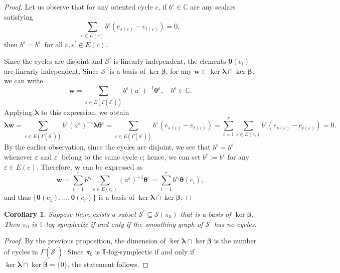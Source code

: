 \documentclass[11pt]{article}
\newcommand{\bbeta}{\boldsymbol{\beta}}
\newcommand{\blambda}{\boldsymbol{\lambda}}
\newcommand{\btheta}{{\boldsymbol{\theta}}}
\newcommand{\bw}{\mathbf{w}}
\newtheorem{corollary}[theorem]{Corollary}
\theoremstyle{definition}\newtheorem{definition}[theorem]{Definition}
\theoremstyle{definition}\newtheorem{remark}[theorem]{Remark}
\theoremstyle{remark}
\numberwithin{equation}{section}
\begin{document}
\begin{proof}
    Let us observe that for any oriented cycle $c$, if $b^{\varepsilon} \in \mathbb{C}$ are any scalars satisfying
    \begin{equation*}
        \sum_{\varepsilon \in E(c)} b^{\varepsilon} (e_{s(\varepsilon)}-e_{t(\varepsilon)}) = 0,
    \end{equation*}
    then $b^{\varepsilon} = b^{\varepsilon^\prime}$ for all $\varepsilon,\varepsilon^\prime \in E(c)$.

    Since the cycles are disjoint and $\mathcal{S}^\prime$ is linearly independent, the elements $\btheta(c_i)$ are linearly independent.
    Since $\mathcal{S}^\prime$ is a basis of $\ker \bbeta$, for any $\bw \in \ker \blambda \cap \ker \bbeta$, we can write
    \begin{equation*}
        \bw = \sum_{\varepsilon \in E(\Gamma(\mathcal{S}^\prime))} b^\varepsilon (a^{\varepsilon})^{-1}\btheta^\varepsilon, \quad b^\varepsilon \in \mathbb{C}.
    \end{equation*}
    Applying $\blambda$ to this expression, we obtain
    \begin{equation*}
        \blambda \bw = \sum_{\varepsilon \in E(\Gamma(\mathcal{S}^\prime))} b^\varepsilon (a^{\varepsilon})^{-1} \blambda \btheta^\varepsilon = \sum_{\varepsilon \in E(\Gamma(\mathcal{S}^\prime))} b^\varepsilon (e_{s(\varepsilon)}-e_{t(\varepsilon)}) = \sum_{i=1}^r \sum_{\varepsilon \in E(c_i)} b^\varepsilon(e_{s(\varepsilon)}-e_{t(\varepsilon)}) = 0.
    \end{equation*}
    By the earlier observation, since the cycles are disjoint, we see that $b^\varepsilon = b^{\varepsilon^\prime}$ whenever $\varepsilon$ and $\varepsilon^\prime$ belong to the same cycle $c$; hence, we can set $b^{c}:=b^{\varepsilon}$ for any $\varepsilon \in E(c)$. Therefore, $\bw$ can be expressed as
    \begin{equation*}
        \bw = \sum_{i=1}^r b^{c_i} \sum_{\varepsilon \in E(c_i)} (a^{\varepsilon})^{-1} \btheta^{\varepsilon} = \sum_{i=1}^r b^{c_i} \btheta(c_i),
    \end{equation*}
    and thus $\{\btheta(c_1),\ldots,\btheta(c_r)\}$ is a basis of $\ker \blambda \cap \ker \bbeta$.
\end{proof}
\begin{corollary}\label{c:cycles_tlogs}
   Suppose there exists a subset $\mathcal{S}^\prime \subseteq \mathcal{S}(\pi_0)$ that is a basis of $\ker \bbeta$. Then $\pi_0$ is $\mathbb{T}$-log-symplectic if and only if the smoothing graph of $\mathcal{S}^\prime$ has no cycles.
\end{corollary}
\begin{proof}
    By the previous proposition, the dimension of $\ker \blambda \cap \ker \bbeta$ is the number of cycles in $\Gamma(\mathcal{S}^\prime)$. Since $\pi_0$ is $\mathbb{T}$-log-symplectic if and only if $\ker \blambda \cap \ker \bbeta = \{0\}$, the statement follows.
\end{proof}
\end{document}

